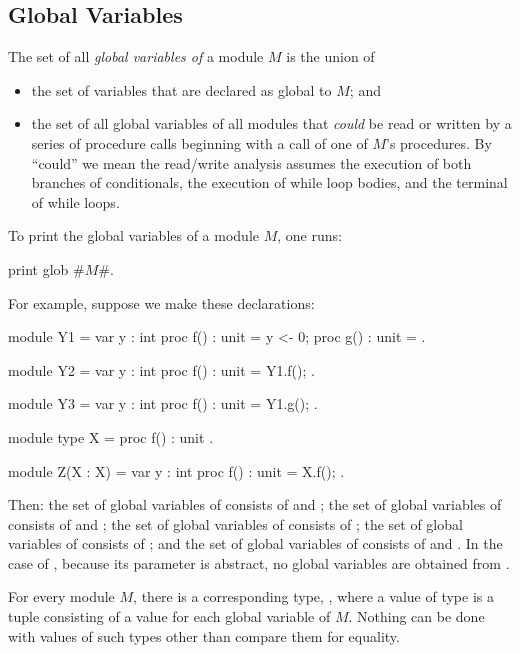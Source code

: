 \subsection{Global Variables}
\label{GlobalVariables}

The set of all \emph{global variables of} a module $M$ is the
union of
\begin{itemize}
\item the set of variables that are declared as global to $M$; and

\item the set of all global variables of all modules that \emph{could}
  be read or written by a series of procedure calls beginning with a
  call of one of $M$'s procedures. By ``could'' we mean the read/write
  analysis assumes the execution of both branches of conditionals, the
  execution of while loop bodies, and the terminal of while loops.
\end{itemize}
To print the global variables of a module $M$, one runs:
\begin{easycrypt}{}{}
print glob #$M$#.
\end{easycrypt}

For example, suppose we make these declarations:
\begin{easycrypt}{}{}
module Y1 = {
  var y : int
  proc f() : unit = { y <- 0; }
  proc g() : unit = { }
}.

module Y2 = {
  var y : int
  proc f() : unit = { Y1.f(); }
}.

module Y3 = {
  var y : int
  proc f() : unit = { Y1.g(); }
}.

module type X = {
  proc f() : unit
}.

module Z(X : X) = {
  var y : int
  proc f() : unit = { X.f(); }
}.
\end{easycrypt}
Then: the set of global variables of  consists of  and
; the set of global variables of  consists of
 and ; the set of global variables of 
consists of ; the set of global variables of  consists
of ; and the set of global variables of  consists of
 and . In the case of , because its parameter
 is abstract, no global variables are obtained from .

For every module $M$, there is a corresponding type, ,
where a value of type  is a tuple consisting of
a value for each global variable of $M$. Nothing can be done with
values of such types other than compare them for equality.

